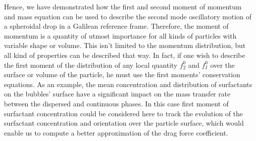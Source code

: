 

Hence, we have demonstrated how the first and second moment of momentum and mass equation can be used to describe the second mode oscillatory motion of a spheroidal drop in a Galilean reference frame. 
Therefore, the moment of momentum is a quantity of utmost importance for all kinds of particles with variable shape or volume.
This isn't limited to the momentum distribution, but all kind of properties can be described that way. 
In fact, if one wish to describe the first moment of the distribution of any local quantity $f_2^0$ and $f_I^0$ over the surface or volume of the particle, he must use the first moments' conservation equations. 
As an example, the mean concentration and distribution of surfactants on the bubbles' surface have a significant impact on the mass transfer rate between the dispersed and continuous phases.
In this case first moment of surfactant concentration could be considered here to track the evolution of the surfactant concentration and orientation over the particle surface, which would enable us to compute a better approximation of the drag force coefficient. 

